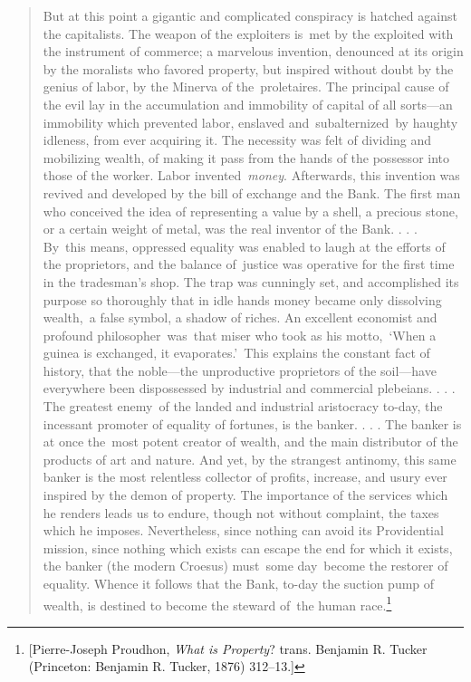 \documentclass[openany,nobib]{tufte-book}
\begin{document}
\begin{quote}
But at this point a gigantic and complicated conspiracy is hatched
against the capitalists. The weapon of the exploiters is~met by the
exploited with the instrument of commerce; a marvelous invention,
denounced at its origin by the moralists who favored property, but
inspired without doubt by the genius of labor, by the Minerva of
the~proletaires. The principal cause of the evil lay in the accumulation
and immobility of capital of all sorts---an immobility which prevented
labor, enslaved and~subalternized~by haughty idleness, from ever
acquiring it. The necessity was felt of dividing and mobilizing wealth,
of making it pass from the hands of the possessor into those of the
worker. Labor invented~\emph{money}. Afterwards, this invention was
revived and developed by the bill of exchange and the Bank. The first
man who conceived the idea of representing a value by a shell, a
precious stone, or a certain weight of metal, was the real inventor of
the Bank. . . . By~this means, oppressed equality was enabled to laugh
at the efforts of the proprietors, and the balance of~justice was
operative for the first time in the tradesman's shop. The trap was
cunningly set, and accomplished its purpose so thoroughly that in idle
hands money became only dissolving wealth,~a false symbol, a shadow of
riches. An excellent economist and profound philosopher~was~that miser
who took as his motto,~`When a guinea is exchanged, it evaporates.'~This
explains the constant fact of history, that the noble---the unproductive
proprietors of the soil---have everywhere been dispossessed by
industrial and commercial plebeians. . . . The greatest enemy~of the
landed and industrial aristocracy to-day, the incessant promoter of
equality of fortunes, is the banker. . . . The banker is at once
the~most potent creator of wealth, and the main distributor of the
products of art and nature. And yet, by the strangest antinomy, this
same banker is the most relentless collector of profits, increase, and
usury ever inspired by the demon of property. The importance of the
services which he renders leads us to endure, though not without
complaint, the taxes which he imposes. Nevertheless, since nothing can
avoid its Providential mission, since nothing which exists can escape
the end for which it exists, the banker (the modern Croesus) must~some
day~become the restorer of equality. Whence it follows that the Bank,
to-day the suction pump of wealth, is destined to become the steward
of~the human race.\footnote{{[}Pierre-Joseph Proudhon, \emph{What is
  Property}? trans. Benjamin R. Tucker (Princeton: Benjamin R. Tucker,
  1876) 312--13.{]}}
\end{quote}
\end{document}
